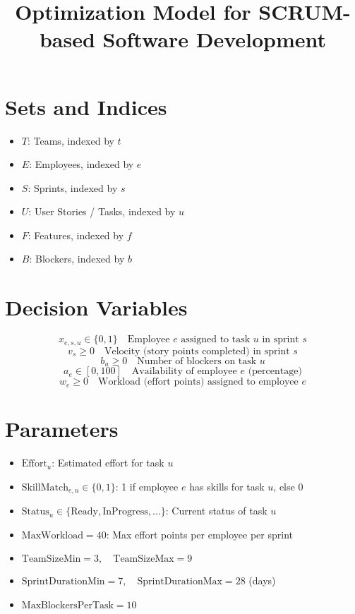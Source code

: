 \documentclass{article}
\title{Optimization Model for SCRUM-based Software Development}
\author{}
\date{}
\begin{document}
\maketitle

\section*{Sets and Indices}
\begin{itemize}
    \item \( T \): Teams, indexed by \( t \)
    \item \( E \): Employees, indexed by \( e \)
    \item \( S \): Sprints, indexed by \( s \)
    \item \( U \): User Stories / Tasks, indexed by \( u \)
    \item \( F \): Features, indexed by \( f \)
    \item \( B \): Blockers, indexed by \( b \)
\end{itemize}

\section*{Decision Variables}
\[
x_{e,s,u} \in \{0,1\} \quad \text{Employee } e \text{ assigned to task } u \text{ in sprint } s
\]
\[
v_s \geq 0 \quad \text{Velocity (story points completed) in sprint } s
\]
\[
b_u \geq 0 \quad \text{Number of blockers on task } u
\]
\[
a_e \in [0,100] \quad \text{Availability of employee } e \text{ (percentage)}
\]
\[
w_e \geq 0 \quad \text{Workload (effort points) assigned to employee } e
\]

\section*{Parameters}
\begin{itemize}
    \item \( \text{Effort}_{u} \): Estimated effort for task \(u\)
    \item \( \text{SkillMatch}_{e,u} \in \{0,1\} \): 1 if employee \(e\) has skills for task \(u\), else 0
    \item \( \text{Status}_{u} \in \{\text{Ready}, \text{InProgress}, \ldots\} \): Current status of task \(u\)
    \item \( \text{MaxWorkload} = 40 \): Max effort points per employee per sprint
    \item \( \text{TeamSizeMin} = 3, \quad \text{TeamSizeMax} = 9 \)
    \item \( \text{SprintDurationMin} = 7, \quad \text{SprintDurationMax} = 28 \) (days)
    \item \( \text{MaxBlockersPerTask} = 10 \)
\end{itemize}
\end{document}
